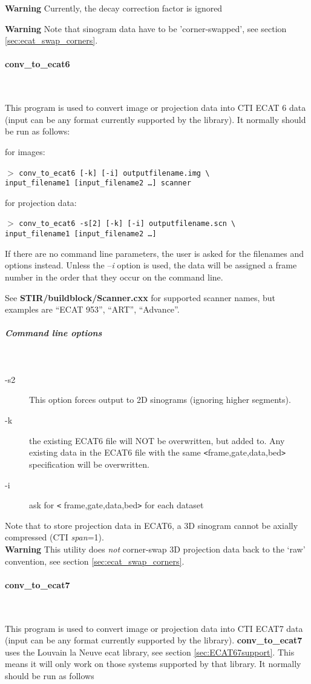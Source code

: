 \documentclass{article}
\newcommand{\subsubsubsection}[1]{\paragraph{#1}\mbox{} \\}
\newcommand{\subsubsubsubsection}[1]{\subparagraph{#1} \mbox{} \\}
\newcommand{\cmdline}[1]{\par \noindent $>$ \texttt{#1}\par}
\begin{document}
{\textbf{Warning} Currently, the decay correction factor is ignored 

\textbf{Warning} Note that sinogram data have to be 'corner-swapped', 
see section \ref{sec:ecat_swap_corners}.

{ \subsubsubsection{conv\_to\_ecat6}
}
This program is used to convert image or projection data into 
CTI ECAT 6 data (input can be any format currently supported 
by the library). It normally should be run as follows:


for images:
\cmdline{conv\_to\_ecat6 [-k] [-i] outputfilename.img {\textbackslash}\\
input\_filename1 [input\_filename2 \dots ] scanner}


for projection data:
\cmdline{conv\_to\_ecat6 -s[2] [-k] [-i] outputfilename.scn {\textbackslash}\\
input\_filename1 [input\_filename2 \dots ]}


If there are no command line parameters, the user is asked for 
the filenames and options instead. Unless the --\textit{i} option is 
used, the data will be assigned a frame number in the order that 
they occur on the command line.


See \textbf{STIR/buildblock/Scanner.cxx} for supported scanner names, 
but examples are ``ECAT 953'', ``ART'', 
``Advance''. 


{ \subsubsubsubsection{Command line options}
}\begin{description}
\item[-s2] This option forces output to 2D sinograms (ignoring higher 
segments).
\item[-k] the existing ECAT6 file will NOT be overwritten, but added 
to. Any existing data in the ECAT6 file with the same \texttt{<}frame,gate,data,bed\texttt{>} 
specification will be overwritten.
\item[-i] ask for \texttt{<} frame,gate,data,bed\texttt{>} for each dataset
\end{description}

Note that to store projection data in ECAT6, a 3D sinogram cannot 
be axially compressed (CTI \textit{span}=1).\\
\textbf{Warning} This utility does \textit{not} corner-swap 3D projection 
data back to the `raw' convention, see section \ref{sec:ecat_swap_corners}.

{ \subsubsubsection{conv\_to\_ecat7}
}
This program is used to convert image or projection data into 
CTI ECAT7 data (input can be any format currently supported by 
the library). \textbf{conv\_to\_ecat7} uses the Louvain la Neuve ecat 
library, see section \ref{sec:ECAT67support}. This means it will only work on those 
systems supported by that library. It normally should be run 
as follows


}
\end{document}
